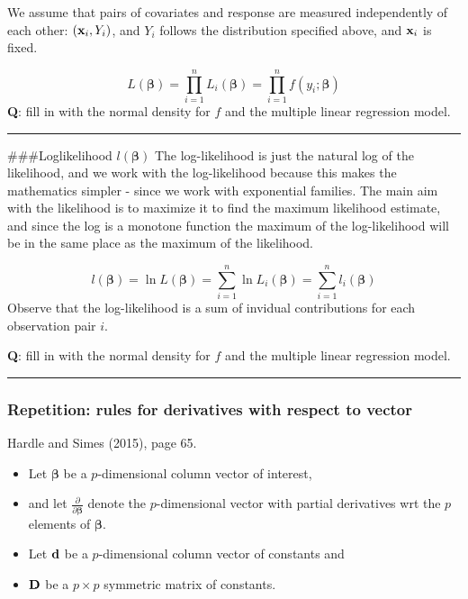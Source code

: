 \documentclass[
]{article}
\providecommand{\tightlist}{%
  \setlength{\itemsep}{0pt}\setlength{\parskip}{0pt}}
\begin{document}
We assume that pairs of covariates and response are measured
independently of each other: \(({\bf x}_i,Y_i)\), and \(Y_i\) follows
the distribution specified above, and \({\bf x}_i\) is fixed.

\[L(\boldsymbol{\beta})=\prod_{i=1}^n L_i(\boldsymbol{\beta})=\prod_{i=1}^n f(y_i; \boldsymbol{\beta})\]
\textbf{Q}: fill in with the normal density for \(f\) and the multiple
linear regression model.

\begin{center}\rule{0.5\linewidth}{0.5pt}\end{center}

\#\#\#Loglikelihood \(l(\boldsymbol{\beta})\) The log-likelihood is just
the natural log of the likelihood, and we work with the log-likelihood
because this makes the mathematics simpler - since we work with
exponential families. The main aim with the likelihood is to maximize it
to find the maximum likelihood estimate, and since the log is a monotone
function the maximum of the log-likelihood will be in the same place as
the maximum of the likelihood.

\[
l(\boldsymbol{\beta})=\ln L(\boldsymbol{\beta})=\sum_{i=1}^n \ln L_i(\boldsymbol{\beta})=\sum_{i=1}^n l_i(\boldsymbol{\beta})
\] Observe that the log-likelihood is a sum of invidual contributions
for each observation pair \(i\).

\textbf{Q}: fill in with the normal density for \(f\) and the multiple
linear regression model.

\begin{center}\rule{0.5\linewidth}{0.5pt}\end{center}

\hypertarget{repetition-rules-for-derivatives-with-respect-to-vector}{%
\subsubsection{Repetition: rules for derivatives with respect to
vector}\label{repetition-rules-for-derivatives-with-respect-to-vector}}

Hardle and Simes (2015), page 65.

\begin{itemize}
\tightlist
\item
  Let \({\boldsymbol{\beta}}\) be a \(p\)-dimensional column vector of
  interest,
\item
  and let \(\frac{\partial}{\partial {\boldsymbol{\beta}}}\) denote the
  \(p\)-dimensional vector with partial derivatives wrt the \(p\)
  elements of \({\boldsymbol{\beta}}\).
\item
  Let \({\bf d}\) be a \(p\)-dimensional column vector of constants and
\item
  \({\bf D}\) be a \(p\times p\) symmetric matrix of constants.
\end{itemize}
\end{document}

